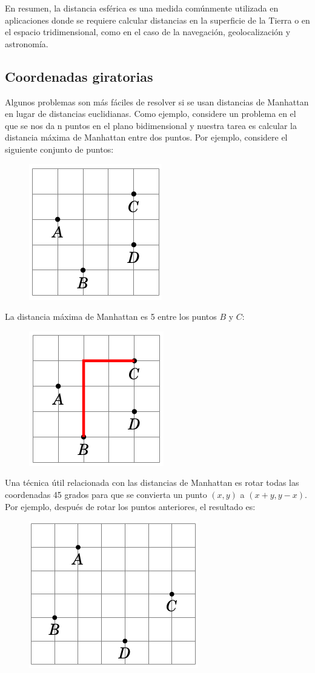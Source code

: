 En resumen, la distancia esférica es una medida comúnmente utilizada en aplicaciones donde se requiere calcular distancias en la superficie de la Tierra o en el espacio tridimensional, como en el caso de la navegación, geolocalización y astronomía.

\subsection{Coordenadas giratorias}

Algunos problemas son más fáciles de resolver si se usan distancias de Manhattan en lugar de distancias euclidianas. Como ejemplo, considere un problema en el que se nos da n puntos en el plano bidimensional y nuestra tarea es calcular la distancia máxima de Manhattan entre dos puntos. Por ejemplo, considere el siguiente conjunto de puntos:

\begin{figure}[!h]
	\centering
	\includegraphics[width=0.25\linewidth]{img/diistance_functios_1}
	\label{fig:diistancefunctios1}
\end{figure}

La distancia máxima de Manhattan es 5 entre los puntos $B$ y $C$:

\begin{figure}[!h]
	\centering
	\includegraphics[width=0.25\linewidth]{img/diistance_functios_2}
	\label{fig:diistancefunctios2}
\end{figure}

Una técnica útil relacionada con las distancias de Manhattan es rotar todas las coordenadas 45 grados para que se convierta un punto $(x,y)$ a $(x + y, y - x)$. Por ejemplo, después de rotar los puntos anteriores, el resultado es:

\begin{figure}[!h]
	\centering
	\includegraphics[width=0.25\linewidth]{img/diistance_functios_3}
	\label{fig:diistancefunctios3}
\end{figure}

